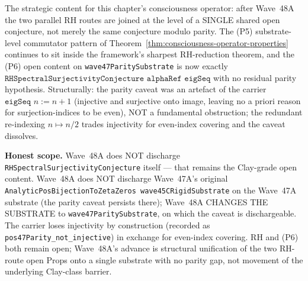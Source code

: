 \begin{remark}
\begin{itemize}
\end{itemize}
The strategic content for this chapter's consciousness operator: after Wave~48A the two parallel RH routes are joined at the level of a SINGLE shared open conjecture, not merely the same conjecture modulo parity. The (P5) substrate-level commutator pattern of Theorem~\ref{thm:consciousness-operator-properties} continues to sit inside the framework's sharpest RH-reduction theorem, and the (P6) open content on \texttt{wave47ParitySubstrate} is now exactly $\texttt{RHSpectralSurjectivityConjecture alphaRef eigSeq}$ with no residual parity hypothesis. Structurally: the parity caveat was an artefact of the carrier $\texttt{eigSeq } n := n + 1$ (injective and surjective onto image, leaving no a priori reason for surjection-indices to be even), NOT a fundamental obstruction; the redundant re-indexing $n \mapsto n/2$ trades injectivity for even-index covering and the caveat dissolves.

\textbf{Honest scope.} Wave~48A does NOT discharge \texttt{RHSpectralSurjectivityConjecture} itself --- that remains the Clay-grade open content. Wave~48A does NOT discharge Wave~47A's original \texttt{AnalyticPosBijectionToZetaZeros wave45CRigidSubstrate} on the Wave~47A substrate (the parity caveat persists there); Wave~48A CHANGES THE SUBSTRATE to \texttt{wave47ParitySubstrate}, on which the caveat is dischargeable. The carrier loses injectivity by construction (recorded as \texttt{pos47Parity\_not\_injective}) in exchange for even-index covering. RH and (P6) both remain open; Wave~48A's advance is structural unification of the two RH-route open Props onto a single substrate with no parity gap, not movement of the underlying Clay-class barrier.
\end{remark}

